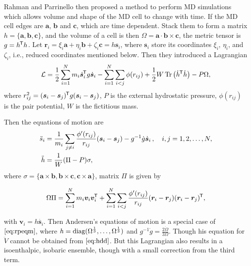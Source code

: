 Rahman and Parrinello then proposed a method to perform
MD simulations which allows volume and shape of the MD cell
to change with time.\cite{Parrinello:1980kx}
If the MD cell edges are $\bm{a}$, $\bm{b}$
and $\bm{c}$, which are time dependent. Stack them to form a
matrix $h = \{ \bm{a}, \bm{b}, \bm{c} \}$, and the volume of a cell
is then $\Omega = \bm{a} \cdot \bm{b} \times \bm{c}$, the metric
tensor is $g = h^{\mkern-1.5mu\mathsf{T}} h$. Let $\bm{r}_i = \xi_i \bm{a} + \eta_i \bm{b}
	+ \zeta_i \bm{c} = h \bm{s}_i$, where $\bm{s}_i$ store its coordinates
$\xi_i$, $\eta_i$, and $\zeta_i$, i.e., reduced coordinates mentioned below.
Then they introduced a Lagrangian
\begin{equation}\label{eq:rplag}
	\mathcal{L} = \frac{ 1 }{ 2 } \sum_{i=1}^{N} m_i \dot{ \bm{s} }_i ^{\mkern-1.5mu\mathsf{T}}
	g \dot{ \bm{s} }_i - \sum_{i=1}^{N} \sum_{i<j} \phi (r_{ij}) +
	\frac{ 1 }{ 2 } W \Tr \big(\dot{h} ^{\mkern-1.5mu\mathsf{T}} \dot{h} \big) - P \Omega,
\end{equation}
where $r_{ij}^2 = (\bm{s}_i - \bm{s}_j)^{\mkern-1.5mu\mathsf{T}} g (\bm{s}_i - \bm{s}_j)$,
$P$ is the external hydrostatic pressure, $\phi(r_{ij})$ is the pair
potential, $W$ is the fictitious mass.

Then the equations of motion are
\begin{subequations}
	\label{eq:rpeqm}
	\begin{align}
		\ddot{s}_i & = \frac{ 1 }{ m_i } \sum_{j\neq i}
		\frac{ \phi'(r_{ij}) }{ r_{ij} } (\bm{s}_i - \bm{s}_j) - g^{-1}\dot{g}
		\dot{ \bm{s} }_i \thinspace, \quad i, j = 1, 2, \ldots, N,\label{eq:rpsdd} \\
		\ddot{h}   & = \frac{ 1 }{ W } (\Pi - P) \sigma, \label{eq:hdd}
	\end{align}
\end{subequations}
where $\sigma = \{\bm{a}\times \bm{b},
	\bm{b}\times \bm{c}, \bm{c}\times \bm{a}\}$,
matrix $\Pi$ is given by

\begin{equation}\label{eq:pim&frr}
	\Omega \Pi = \sum_{i=1}^{N} m_i \bm{v}_i \bm{v}_i^{\mkern-1.5mu\mathsf{T}}
	+ \sum_{i=1}^{N} \sum_{i<j} \frac{ \phi'(r_{ij}) }{ r_{ij} }
	(\bm{r}_i - \bm{r}_j) (\bm{r}_i - \bm{r}_j)^{\mkern-1.5mu\mathsf{T}},
\end{equation}

with $\bm{v}_i = h \dot{ \bm{s}_i }$.
Then Andersen's equations of motion is a special case of
$\eqref{eq:rpeqm}$,
where $h = \operatorname{diag} (\Omega^{\frac{ 1 }{ 3 }}, \ldots,
	\Omega^{\frac{ 1 }{ 3 }})$ and $g^{-1} \dot{g} =
	\frac{ 2 \dot{\Omega} }{3 \Omega }$. Though his equation for
$\ddot{V}$ cannot be obtained from $\eqref{eq:hdd}$. But
this Lagrangian also results in a isoenthalpic, isobaric ensemble,
though with a small correction from the third term.


